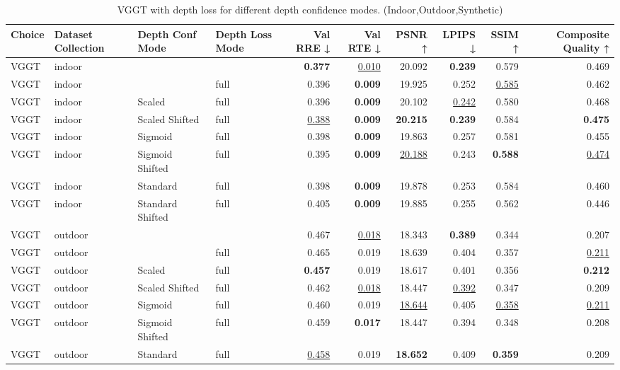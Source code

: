 \begin{table}[H]
\caption{\ifdefined\customcaption \customcaption \else VGGT with depth loss for different depth confidence modes. (Indoor,Outdoor,Synthetic) \fi}
\label{tab:05_depth_conf_mode_indoor,outdoor,synthetic}
\centering
\scriptsize
\begin{tabular}{llllrrrrrr}
\toprule
Choice & Dataset Collection & Depth Conf Mode & Depth Loss Mode & Val RRE ↓ & Val RTE ↓ & PSNR ↑ & LPIPS ↓ & SSIM ↑ & Composite Quality ↑ \\
\midrule
VGGT & indoor &  &  & \textbf{0.377} & \underline{0.010} & 20.092 & \textbf{0.239} & 0.579 & 0.469 \\
VGGT & indoor &  & full & 0.396 & \textbf{0.009} & 19.925 & 0.252 & \underline{0.585} & 0.462 \\
VGGT & indoor & Scaled & full & 0.396 & \textbf{0.009} & 20.102 & \underline{0.242} & 0.580 & 0.468 \\
VGGT & indoor & Scaled Shifted & full & \underline{0.388} & \textbf{0.009} & \textbf{20.215} & \textbf{0.239} & 0.584 & \textbf{0.475} \\
VGGT & indoor & Sigmoid & full & 0.398 & \textbf{0.009} & 19.863 & 0.257 & 0.581 & 0.455 \\
VGGT & indoor & Sigmoid Shifted & full & 0.395 & \textbf{0.009} & \underline{20.188} & 0.243 & \textbf{0.588} & \underline{0.474} \\
VGGT & indoor & Standard & full & 0.398 & \textbf{0.009} & 19.878 & 0.253 & 0.584 & 0.460 \\
VGGT & indoor & Standard Shifted & full & 0.405 & \textbf{0.009} & 19.885 & 0.255 & 0.562 & 0.446 \\
\midrule
VGGT & outdoor &  &  & 0.467 & \underline{0.018} & 18.343 & \textbf{0.389} & 0.344 & 0.207 \\
VGGT & outdoor &  & full & 0.465 & 0.019 & 18.639 & 0.404 & 0.357 & \underline{0.211} \\
VGGT & outdoor & Scaled & full & \textbf{0.457} & 0.019 & 18.617 & 0.401 & 0.356 & \textbf{0.212} \\
VGGT & outdoor & Scaled Shifted & full & 0.462 & \underline{0.018} & 18.447 & \underline{0.392} & 0.347 & 0.209 \\
VGGT & outdoor & Sigmoid & full & 0.460 & 0.019 & \underline{18.644} & 0.405 & \underline{0.358} & \underline{0.211} \\
VGGT & outdoor & Sigmoid Shifted & full & 0.459 & \textbf{0.017} & 18.447 & 0.394 & 0.348 & 0.208 \\
VGGT & outdoor & Standard & full & \underline{0.458} & 0.019 & \textbf{18.652} & 0.409 & \textbf{0.359} & 0.209 \\

\end{tabular}
\end{table}
